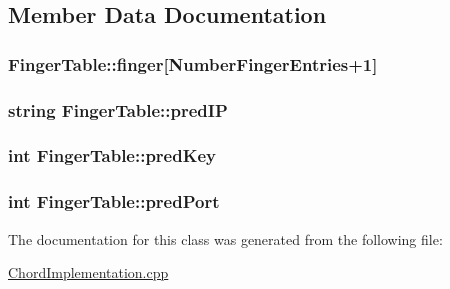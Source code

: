 \subsection{Member Data Documentation}
\hypertarget{class_finger_table_a66c37dcb768ddd822e14f32b02aef7e6}{
\subsubsection[{finger}]{ Finger\+Table\+::finger\mbox{[}{\bf Number\+Finger\+Entries}+1\mbox{]}}}\label{class_finger_table_a66c37dcb768ddd822e14f32b02aef7e6}
\hypertarget{class_finger_table_ab0725b4fcbdb31ec8c9952756934f2bd}{
\subsubsection[{pred\+I\+P}]{\setlength{\rightskip}{0pt plus 5cm}string Finger\+Table\+::pred\+I\+P}}\label{class_finger_table_ab0725b4fcbdb31ec8c9952756934f2bd}
\hypertarget{class_finger_table_aa0eb20d47e2f6ca1977bfda7db4c4789}{
\subsubsection[{pred\+Key}]{\setlength{\rightskip}{0pt plus 5cm}int Finger\+Table\+::pred\+Key}}\label{class_finger_table_aa0eb20d47e2f6ca1977bfda7db4c4789}
\hypertarget{class_finger_table_a4b31f66a2ac235e2fde247f869635a28}{
\subsubsection[{pred\+Port}]{\setlength{\rightskip}{0pt plus 5cm}int Finger\+Table\+::pred\+Port}}\label{class_finger_table_a4b31f66a2ac235e2fde247f869635a28}


The documentation for this class was generated from the following file\+:\begin{DoxyCompactItemize}
\item 
\hyperlink{_chord_implementation_8cpp}{Chord\+Implementation.\+cpp}\end{DoxyCompactItemize}
